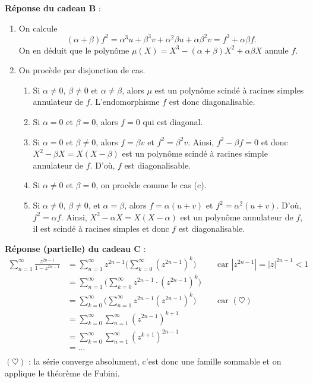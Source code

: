 \documentclass[a4paper]{article}
\begin{document}
	\bigskip\bigskip
	\textbf{Réponse du cadeau B} :\\
	\begin{enumerate}
		\item On calcule
			\[
				(\alpha + \beta) f^2 = \alpha^3 u + \beta^3 v + \alpha^2 \beta u + \alpha \beta^2 v = f^3 + \alpha \beta f
			.\]
			On en déduit que le polynôme $\mu(X) = X^3 - (\alpha + \beta) X^2 + \alpha \beta X$ annule $f$.
		\item On procède par disjonction de cas.
			\begin{enumerate}
				\item Si $\alpha \neq 0$, $\beta \neq 0$ et $\alpha \neq \beta$, alors $\mu$ est un polynôme scindé à racines simples annulateur de $f$. L'endomorphisme $f$ est donc diagonalisable.
				\item Si $\alpha = 0$ et $\beta = 0$, alors $f = 0$ qui est diagonal.
				\item Si $\alpha = 0$ et $\beta \neq 0$, alors $f = \beta v$ et $f^2 = \beta^2 v$.
					Ainsi, $f^2 - \beta f = 0$ et donc $X^2 - \beta X = X(X-\beta)$ est un polynôme scindé à racines simple annulateur de $f$. D'où, $f$ est diagonalisable.
				\item Si $\alpha \neq 0$ et $\beta = 0$, on procède comme le cas (c).
				\item Si $\alpha \neq 0$, $\beta \neq 0$, et $\alpha = \beta$, alors $f = \alpha (u+v)$ et $f^2 = \alpha^2 (u + v)$. D'où, $f^2 = \alpha f$.
					Ainsi, $X^2 - \alpha X = X(X - \alpha)$ est un polynôme annulateur de $f$, il est scindé à racines simples et donc $f$ est diagonalisable.
			\end{enumerate}
	\end{enumerate}

	\bigskip\bigskip
	\textbf{Réponse \textmd{(partielle)} du cadeau C} :\\
	\begin{align*}
		\sum_{n=1}^\infty \frac{z^{2n-1}}{1-z^{2n-1}}
		&= \sum_{n=1}^\infty z^{2n-1} \Big(\sum_{k=0}^\infty (z^{2n-1})^k\Big) && \text{ car } |z^{2n-1}| = |z|^{2n-1} < 1\\
		&= \sum_{n=1}^\infty \Big( \sum_{k=0}^\infty z^{2n-1} \cdot (z^{2n-1})^k\Big) \\
		&= \sum_{k=0}^\infty \Big(\sum_{n=1}^\infty z^{2n-1}(z^{2n-1})^k\Big) && \text{ car } (\heartsuit) \\
		&= \sum_{k=0}^\infty \sum_{n=1}^\infty (z^{2n-1})^{k+1} \\
		&= \sum_{k=0}^\infty \sum_{n=1}^\infty (z^{k+1})^{2n-1} \\
		&= \ldots \\
	\end{align*}
	$(\heartsuit)$ : la série converge absolument, c'est donc une famille sommable et on applique le théorème de Fubini.
\end{document}
